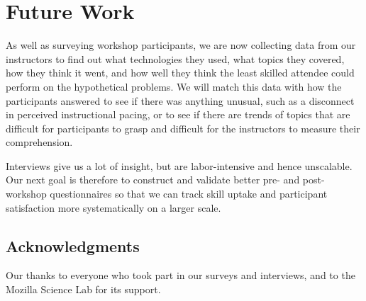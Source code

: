 \documentclass[10pt, twocolumn]{article}
\begin{document}
\section{Future Work}

As well as surveying workshop participants,
we are now collecting data from our instructors
to find out what technologies they used,
what topics they covered,
how they think it went,
and how well they think the least skilled attendee could perform on the hypothetical problems.
We will match this data with how the participants answered to see if there was anything unusual,
such as a disconnect in perceived instructional pacing,
or to see if there are trends of topics that are difficult for participants to grasp
and difficult for the instructors to measure their comprehension.

Interviews give us a lot of insight,
but are labor-intensive and hence unscalable.
Our next goal is therefore to construct and validate better pre- and post-workshop questionnaires
so that we can track skill uptake and participant satisfaction
more systematically on a larger scale.

\subsection*{Acknowledgments}

Our thanks to everyone who took part in our surveys and interviews,
and to the Mozilla Science Lab for its support.

{\small
	
	
}
\end{document}
